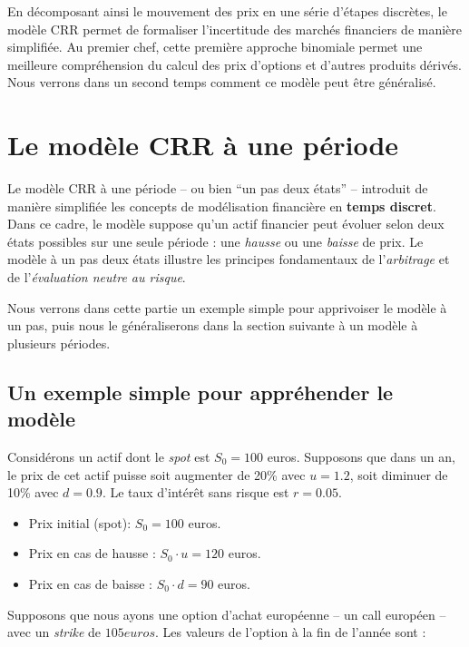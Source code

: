 \documentclass[12pt,a4paper]{article}
\newcommand{\quotes}[1]{``#1''}
\begin{document}
En décomposant ainsi le mouvement des prix en une série d'étapes discrètes, le modèle CRR permet de formaliser l'incertitude des marchés financiers de manière simplifiée. Au premier chef, cette première approche binomiale permet une meilleure compréhension du calcul des prix d'options et d'autres produits dérivés. Nous verrons dans un second temps comment ce modèle peut être généralisé.

\section{Le modèle CRR à une période}

Le modèle CRR à une période -- ou bien \quotes{un pas deux états} -- introduit de manière simplifiée les concepts de modélisation financière en \textbf{temps discret}. Dans ce cadre, le modèle suppose qu'un actif financier peut évoluer selon deux états possibles sur une seule période : une \textit{hausse} ou une \textit{baisse} de prix. Le modèle à un pas deux états illustre les principes fondamentaux de l'\textit{arbitrage} et de l'\textit{évaluation neutre au risque}.

Nous verrons dans cette partie un exemple simple pour apprivoiser le modèle à un pas, puis nous le généraliserons dans la section suivante à un modèle à plusieurs périodes.

\subsection{Un exemple simple pour appréhender le modèle}

Considérons un actif dont le \textit{spot} est \( S_0 = 100\) euros. Supposons que dans un an, le prix de cet actif puisse soit augmenter de 20\% avec \( u = 1.2 \), soit diminuer de 10\% avec \( d = 0.9 \). Le taux d'intérêt sans risque est \( r = 0.05 \).

\begin{itemize}
    \item Prix initial (spot): \( S_0 = 100\) euros.
    \item Prix en cas de hausse : \( S_0 \cdot u = 120\) euros.
    \item Prix en cas de baisse : \( S_0 \cdot d = 90\) euros.
\end{itemize}

Supposons que nous ayons une option d'achat européenne -- un call européen -- avec un \textit{strike} de $105 euros$. Les valeurs de l'option à la fin de l'année sont :
\end{document}
